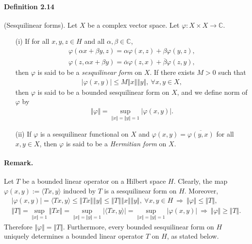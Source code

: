 \documentclass{article}
\begin{document}
\paragraph{Definition 2.14\label{def:2.14}} (Sesquilinear forms). Let $X$ be a complex vector space. Let $\varphi:X\times X\to\mathbb{C}$.
\begin{itemize}
\item[(i)] If for all $x,y,z\in H$ and all $\alpha,\beta\in\mathbb{C}$,
\begin{align*}
	\varphi(\alpha x+\beta y,z) = \alpha\varphi(x,z) + \beta\varphi(y,z),\\
	\varphi(z,\alpha x+\beta y) = \overline{\alpha}\varphi(z,x) + \overline{\beta}\varphi(z,y),
\end{align*}
then $\varphi$ is said to be a \textit{sesquilinear form} on $X$. If there exists $M>0$ such that
\begin{align*}
	\vert\varphi(x,y)\vert\leq M\left\Vert x\right\Vert\left\Vert y\right\Vert,\ \forall x,y\in X,
\end{align*}
then $\varphi$ is said to be a bounded sesquilinear form on $X$, and we define norm of $\varphi$ by
\begin{align*}
	\Vert\varphi\Vert = \sup_{\Vert x\Vert=\Vert y\Vert =1}\vert\varphi(x,y)\vert.
\end{align*}
\item[(ii)] If $\varphi$ is a sesquilinear functional on $X$ and $\varphi(x,y)=\overline{\varphi(y,x)}$ for all $x,y\in X$, then $\varphi$ is said to be a \textit{Hermitian form} on $X$.
\end{itemize}

\paragraph{Remark.} Let $T$ be a bounded linear operator on a Hilbert space $H$. Clearly, the map $\varphi(x,y):=\langle Tx,y\rangle$ induced by $T$ is a sesquilinear form on $H$. Moreover,
\begin{align*}
	\vert\varphi(x,y)\vert = \langle Tx,y\rangle\leq\left\Vert Tx\right\Vert\left\Vert y\right\Vert\leq\left\Vert T\right\Vert\left\Vert x\right\Vert\left\Vert y\right\Vert,\ \forall x,y\in H\ \Rightarrow\ \Vert\varphi\Vert \leq \Vert T\Vert,\\
	\Vert T\Vert = \sup_{\Vert x\Vert=1} \Vert Tx\Vert = \sup_{\Vert x\Vert=\Vert y\Vert = 1} \vert\langle Tx,y\rangle\vert = \sup_{\Vert x\Vert=\Vert y\Vert = 1} \vert\varphi(x,y)\vert\ \Rightarrow\ \Vert\varphi\Vert\geq\Vert T\Vert.
\end{align*}
Therefore $\Vert\varphi\Vert = \Vert T\Vert$. Furthermore, every bounded sesquilinear form on $H$ uniquely determines a bounded linear operator $T$ on $H$, as stated below.
\end{document}
